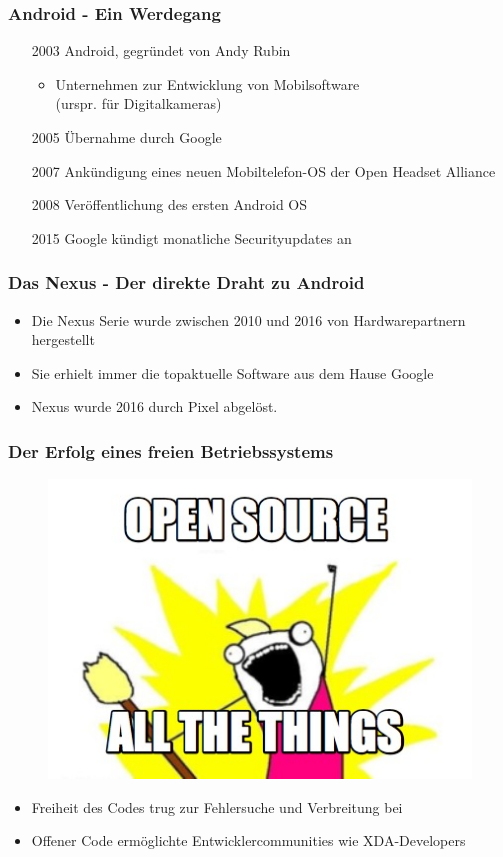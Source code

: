 
\begin{frame}
	\frametitle{Android - Ein Werdegang}
	\begin{itemize}[<+->]
		\item[2003] Android, gegründet von Andy Rubin
		\begin{itemize}	
			\item Unternehmen zur Entwicklung von Mobilsoftware \\(urspr. für Digitalkameras)
		\end{itemize}
		\item[2005] Übernahme durch Google
		\item[2007] Ankündigung eines neuen Mobiltelefon-OS der Open Headset Alliance
		\item[2008] Veröffentlichung des ersten Android OS
		\item[2015] Google kündigt monatliche Securityupdates an
	\end{itemize}
\end{frame}

\begin{frame}
	\frametitle{Das Nexus - Der direkte Draht zu Android}
	\begin{itemize}
		\item Die Nexus Serie wurde zwischen 2010 und 2016 von Hardwarepartnern hergestellt
		\item Sie erhielt immer die topaktuelle Software aus dem Hause Google
		\item Nexus wurde 2016 durch Pixel abgelöst.
	\end{itemize}
\end{frame}

\begin{frame}
\frametitle{Der Erfolg eines freien Betriebssystems}
\begin{figure}
\includegraphics[scale=0.35]{resources/att.jpg}
\end{figure}
	\begin{itemize}
		\item Freiheit des Codes trug zur Fehlersuche und Verbreitung bei
		\item Offener Code ermöglichte Entwicklercommunities wie XDA-Developers
	\end{itemize}
\end{frame}

